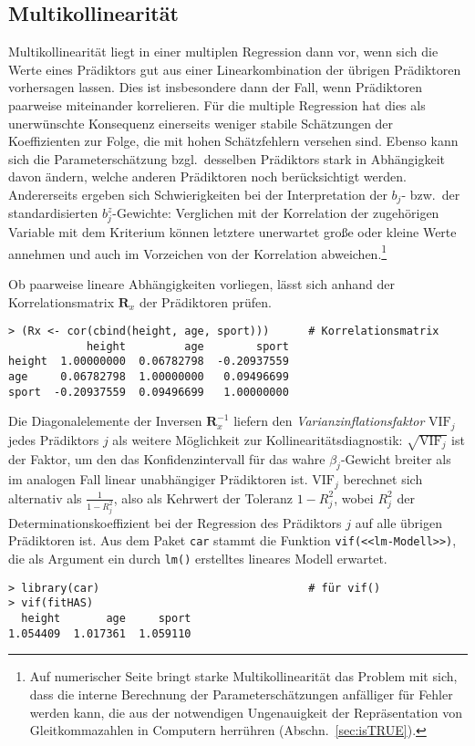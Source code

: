 \subsection{Multikollinearität}
\label{sec:multColl}

Multikollinearität liegt in einer multiplen Regression dann vor, wenn sich die Werte eines Prädiktors gut aus einer Linearkombination der übrigen Prädiktoren vorhersagen lassen. Dies ist insbesondere dann der Fall, wenn Prädiktoren paarweise miteinander korrelieren. Für die multiple Regression hat dies als unerwünschte Konsequenz einerseits weniger stabile Schätzungen der Koeffizienten zur Folge, die mit hohen Schätzfehlern versehen sind. Ebenso kann sich die Parameterschätzung bzgl.\ desselben Prädiktors stark in Abhängigkeit davon ändern, welche anderen Prädiktoren noch berücksichtigt werden. Andererseits ergeben sich Schwierigkeiten bei der Interpretation der $b_{j}$- bzw.\ der standardisierten $b_{j}^{z}$-Gewichte: Verglichen mit der Korrelation der zugehörigen Variable mit dem Kriterium können letztere unerwartet große oder kleine Werte annehmen und auch im Vorzeichen von der Korrelation abweichen.\footnote{Auf numerischer Seite bringt starke Multikollinearität das Problem mit sich, dass die interne Berechnung der Parameterschätzungen anfälliger für Fehler werden kann, die aus der notwendigen Ungenauigkeit der Repräsentation von Gleitkommazahlen in Computern herrühren (Abschn.\ \ref{sec:isTRUE}).}

Ob paarweise lineare Abhängigkeiten vorliegen, lässt sich anhand der Korrelationsmatrix $\bm{R}_{x}$ der Prädiktoren prüfen.
\begin{lstlisting}
> (Rx <- cor(cbind(height, age, sport)))      # Korrelationsmatrix
            height         age        sport
height  1.00000000  0.06782798  -0.20937559
age     0.06782798  1.00000000   0.09496699
sport  -0.20937559  0.09496699   1.00000000
\end{lstlisting}

Die Diagonalelemente der Inversen $\bm{R}_{x}^{-1}$ liefern den \emph{Varianzinflationsfaktor} $\text{VIF}_{j}$ jedes Prädiktors $j$ als weitere Möglichkeit zur Kollinearitätsdiagnostik: $\sqrt{\text{VIF}_{j}}$ ist der Faktor, um den das Konfidenzintervall für das wahre $\beta_{j}$-Gewicht breiter als im analogen Fall linear unabhängiger Prädiktoren ist. $\text{VIF}_{j}$ berechnet sich alternativ als $\frac{1}{1-R_{j}^{2}}$, also als Kehrwert der Toleranz $1-R_{j}^{2}$, wobei $R_{j}^{2}$ der Determinationskoeffizient bei der Regression des Prädiktors $j$ auf alle übrigen Prädiktoren ist. Aus dem Paket \lstinline!car! stammt die Funktion \lstinline!vif(<<lm-Modell>>)!, die als Argument ein durch \lstinline!lm()! erstelltes lineares Modell erwartet.
\begin{lstlisting}
> library(car)                                # für vif()
> vif(fitHAS)
  height       age     sport
1.054409  1.017361  1.059110
\end{lstlisting}


